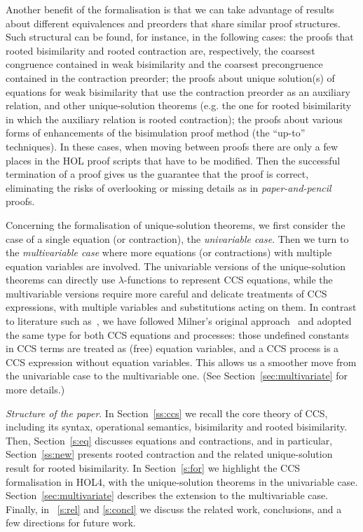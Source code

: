 \documentclass[GCNS]{yincog}
\theoremstyle{remark}
\theoremstyle{theorem}
\theoremstyle{remark}
\newcommand{\univariate}{univariable\xspace}
\newcommand{\multivariate}{multivariable\xspace}
\begin{document}
Another benefit of the formalisation is that we can take advantage of results
about different equivalences and preorders that share similar proof structures.
Such structural  can be found, for instance, in the following
cases: the proofs that rooted bisimilarity and rooted contraction are,
respectively, the coarsest congruence contained in weak bisimilarity and
the coarsest precongruence contained in the contraction preorder; the proofs
about unique solution(s) of equations for weak bisimilarity that use the
contraction preorder as an auxiliary relation, and other unique-solution
theorems (e.g. the one for rooted bisimilarity in which the auxiliary relation
is rooted contraction); the proofs about various forms of enhancements
of the bisimulation proof method (the ``up-to'' techniques). In these cases,
when moving between proofs there are only a few places in the HOL proof
scripts that have to be modified. Then the successful termination of a
proof gives us the guarantee that the proof is correct, eliminating the
risks of overlooking or missing details as in \emph{paper-and-pencil} proofs.

Concerning the formalisation of unique-solution theorems, we first consider
the case of a single equation (or contraction), the
\emph{\univariate case}. Then we turn to the \emph{\multivariate case} where
more equations (or contractions) with multiple equation variables are involved.
The \univariate versions of the unique-solution theorems can directly use
$\lambda $-functions to represent CCS equations, while the
\multivariate versions require more careful and delicate treatments of
CCS expressions, with multiple variables and substitutions acting on them.
In contrast to literature such as~\cite{Gorrieri:2015jt}, we have followed
Milner's original approach~\cite{milner1990operational} and adopted the
same type for both CCS equations and processes: those undefined constants
in CCS terms are treated as (free) equation variables, and a CCS process
is a CCS expression without equation variables. This allows us a smoother
move from the \univariate case to the \multivariate one. (See Section~\ref{sec:multivariate}
for more details.)

\bigskip\noindent\textit{Structure of the paper}.
In Section~\ref{ss:ccs} we recall the core theory of CCS, including its
syntax, operational semantics, bisimilarity and rooted bisimilarity. Then,
Section~\ref{s:eq} discusses equations and contractions, and in particular,
Section~\ref{ss:new} presents rooted contraction and the related unique-solution
result for rooted bisimilarity. In Section~\ref{s:for} we highlight the
CCS formalisation in HOL4, with the unique-solution theorems in the
\univariate case. Section~\ref{sec:multivariate} describes the extension
to the \multivariate case. Finally, in ~\ref{s:rel} and \ref{s:concl} we discuss the related work, conclusions, and a few directions
for future work.
\end{document}
